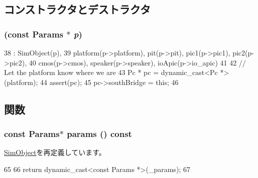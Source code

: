 \subsection{コンストラクタとデストラクタ}
\hypertarget{classSouthBridge_a8a834d2de0708255ca2fa721d196c3f3}{
\subsubsection[{SouthBridge}]{ (const {\bf Params} $\ast$ {\em p})}}
\label{classSouthBridge_a8a834d2de0708255ca2fa721d196c3f3}



\begin{DoxyCode}
38                                         : SimObject(p),
39     platform(p->platform), pit(p->pit), pic1(p->pic1), pic2(p->pic2),
40     cmos(p->cmos), speaker(p->speaker), ioApic(p->io_apic)
41 {
42     // Let the platform know where we are
43     Pc * pc = dynamic_cast<Pc *>(platform);
44     assert(pc);
45     pc->southBridge = this;
46 }
\end{DoxyCode}


\subsection{関数}
\hypertarget{classSouthBridge_acd3c3feb78ae7a8f88fe0f110a718dff}{
\subsubsection[{params}]{\setlength{\rightskip}{0pt plus 5cm}const {\bf Params}$\ast$ params () const}}
\label{classSouthBridge_acd3c3feb78ae7a8f88fe0f110a718dff}


\hyperlink{classSimObject_acd3c3feb78ae7a8f88fe0f110a718dff}{SimObject}を再定義しています。


\begin{DoxyCode}
65     {
66         return dynamic_cast<const Params *>(_params);
67     }
\end{DoxyCode}


